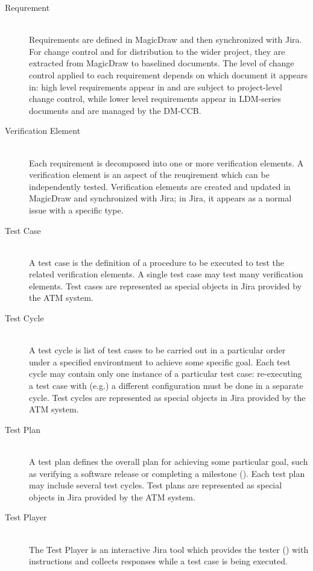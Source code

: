 \begin{description}

\item[Requrement] \hfill \\
Requirements are defined in MagicDraw and then synchronized with Jira.
For change control and for distribution to the wider project, they are extracted from MagicDraw to baselined documents.
The level of change control applied to each requirement depends on which document it appears in: high level requirements appear in  and are subject to project-level change control, while lower level requirements appear in LDM-series documents and are managed by the DM-CCB.

\item[Verification Element] \hfill \\
Each requirement is decomposed into one or more verification elements.
A verification element is an aspect of the reuqirement which can be independently tested.
Verification elements are created and updated in MagicDraw and synchronized with Jira; in Jira, it appears as a normal issue with a specific type.

\item[Test Case] \hfill \\
A test case is the definition of a procedure to be executed to test the related verification elements.
A single test case may test many verification elements.
Test cases are represented as special objects in Jira provided by the ATM system.

\item[Test Cycle] \hfill \\
A test cycle is list of test cases to be carried out in a particular order under a specified environtment to achieve some specific goal.
Each test cycle may contain only one instance of a particular test case: re-executing a test case with (e.g.) a different configuration must be done in a separate cycle.
Test cycles are represented as special objects in Jira provided by the ATM system.

\item[Test Plan] \hfill \\
A test plan defines the overall plan for achieving some particular goal, such as verifying a software release or completing a milestone ().
Each test plan may include several test cycles.
Test plans are represented as special objects in Jira provided by the ATM system.

\item[Test Player] \hfill\\
The Test Player is an interactive Jira tool which provides the tester () with instructions and collects responses while a test case is being executed.


\end{description}
